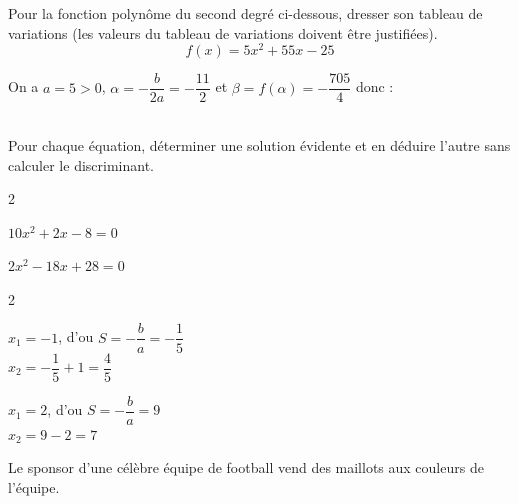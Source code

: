 \documentclass[12pt,a4paper]{article}  %
\begin{document}
\newpage
\vspace{-0.3cm}
Pour la fonction polynôme du second degré ci-dessous, dresser son tableau de variations (les valeurs du tableau de variations doivent être justifiées).
$$f(x)=5x^2+55x-25$$
\begin{corrBox}
    On a $a=5>0$, $\alpha=-\dfrac{b}{2a}=-\dfrac{11}{2}$ et $\beta=f(\alpha)=-\dfrac{705}{4}$ donc :\\
    \ \\
\end{corrBox}

\vspace{-0.3cm}

Pour chaque équation, déterminer une solution évidente et en déduire l'autre sans calculer le discriminant.
\begin{multicols}{2}
\begin{enumMet}
    \item $10x^2+2x-8=0$
    \item $2x^2-18x+28=0$
\end{enumMet}
\end{multicols}

\begin{corrBox}
    \begin{multicols}{2}
        \begin{enumMet}
            \item $x_1=-1$, d'ou $S=-\dfrac{b}{a}=-\dfrac{1}{5}$\\
            $x_2=-\dfrac{1}{5}+1=\dfrac{4}{5}$
            \item $x_1=2$, d'ou $S=-\dfrac{b}{a}=9$\\
            $x_2=9-2=7$
        \end{enumMet}
    \end{multicols}
\end{corrBox}

\newpage


Le sponsor d'une célèbre équipe de football vend des maillots aux couleurs de l'équipe.\\
\end{document}
